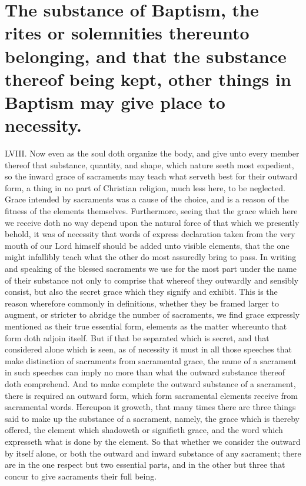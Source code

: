 \section*{The substance of Baptism, the rites or solemnities thereunto belonging, and that the substance thereof being kept, other things in Baptism may give place to necessity.}
LVIII. Now even as the soul doth organize the body, and give unto every member thereof that substance, quantity, and shape, which nature seeth most expedient, so the inward grace of sacraments may teach what serveth best for their outward form, a thing in no part of Christian religion, much less here, to be neglected. Grace intended by sacraments was a cause of the choice, and is a reason of the fitness of the elements themselves. Furthermore, seeing that the grace which here we receive doth no way depend upon the natural force of that which we presently behold, it was of necessity that words of express declaration taken from the very mouth of our Lord himself should be added unto visible elements, that the one might infallibly teach what the other do most assuredly bring to pass.
In writing and speaking of the blessed sacraments we use for the most part under the name of their substance not only to comprise that whereof they outwardly and sensibly consist, but also the secret grace which they signify and  exhibit. This is the reason wherefore commonly in definitions, whether they be framed larger to augment, or stricter to abridge the number of sacraments, we find grace expressly mentioned as their true essential form, elements as the matter whereunto that form doth adjoin itself. But if that be separated which is secret, and that considered alone which is seen, as of necessity it must in all those speeches that make distinction of sacraments from sacramental grace, the name of a sacrament in such speeches can imply no more than what the outward substance thereof doth comprehend. And to make complete the outward substance of a sacrament, there is required an outward form, which form sacramental elements receive from sacramental words. Hereupon it groweth, that many times there are three things said to make up the substance of a sacrament, namely, the grace which is thereby offered, the element which shadoweth or signifieth grace, and the word which expresseth what is done by the element. So that whether we consider the outward by itself alone, or both the outward and inward substance of any sacrament; there are in the one respect but two essential parts, and in the other but three that concur to give sacraments their full being.
